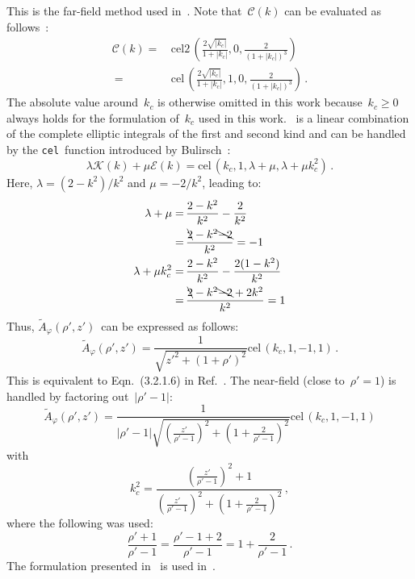 This is the far-field method used in~.
Note that~$\mathcal{C}(k)$ can be evaluated as follows~\cite{bulirsch_1, bulirsch_3}:
\begin{align}
  \mathcal{C}(k) =&\, \textrm{cel2}\,\left(\frac{2 \sqrt{|k_c|}}{1+|k_c|},0,\frac{2}{(1+|k_c|)^3}\right) \nonumber \\
       ~         =&\, \textrm{cel}\,\left(\frac{2 \sqrt{|k_c|}}{1+|k_c|},1,0,\frac{2}{(1+|k_c|)^3}\right) \, .
\end{align}
The absolute value around~$k_c$ is otherwise omitted in this work
because~$k_c \geq 0$ always holds for the formulation of~$k_c$ used in this work.
~is a linear combination of the complete elliptic integrals
of the first and second kind and can be handled by the \texttt{cel}~function
introduced by Bulirsch~\cite{bulirsch_3}:
\begin{equation}
  \lambda \mathcal{K} (k) + \mu \mathcal{E} (k) = \textrm{cel}\,(k_c, 1, \lambda + \mu, \lambda + \mu k_c^2) \, .
\end{equation}
Here, $\lambda = (2 - k^2)/k^2$ and $\mu = -2/k^2$,
leading to:
\begin{align}
  \lambda + \mu       =&\, \frac{2 - k^2}{k^2} - \frac{2}{k^2} \nonumber \\
      ~               =&\, \frac{\bcancel{2} - k^2 \bcancel{-2}}{k^2} = -1 \nonumber \\
  \lambda + \mu k_c^2 =&\, \frac{2 - k^2}{k^2} - \frac{2 (1 - k^2)}{k^2} \nonumber \\
      ~               =&\, \frac{\bcancel{2} - k^2 \bcancel{-2} + 2 k^2}{k^2} = 1
\end{align}
Thus, $\tilde{A}_\varphi(\rho',z')$~can be expressed as follows:
\begin{equation}
 \tilde{A}_\varphi(\rho',z')
 = \frac{1}{\sqrt{z'^2 + (1 + \rho')^2}}
   \textrm{cel}\,(k_c, 1, -1, 1) \, .
\end{equation}
This is equivalent to Eqn.~(3.2.1.6) in Ref.~\cite{teal}.
The near-field (close to~$\rho' = 1$) is handled by factoring out~$|\rho'-1|$:
\begin{equation}
 \tilde{A}_\varphi(\rho',z')
 = \frac{1}{|\rho'-1| \sqrt{\left(\frac{z'}{\rho'-1}\right)^2 + \left(1 + \frac{2}{\rho'-1}\right)^2}}
   \textrm{cel}\,(k_c, 1, -1, 1) \label{eqn:cwl_A_phi_near}
\end{equation}
with
\begin{equation}
  k_c^2 =
  \frac{\left(\frac{z'}{\rho'-1}\right)^2 + 1}
       {\left(\frac{z'}{\rho'-1}\right)^2 + \left(1 + \frac{2}{\rho'-1}\right)^2} \, ,
\end{equation}
where the following was used:
\begin{equation}
    \frac{\rho' + 1}{\rho' - 1}
  = \frac{\rho'-1 + 2}{\rho' - 1}
  = 1 + \frac{2}{\rho' - 1} \, .
\end{equation}
The formulation presented in~ is used in~.




